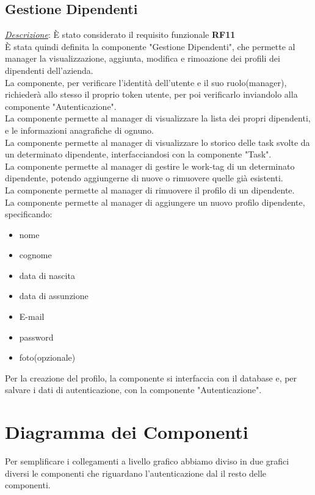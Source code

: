 \documentclass{report}
\begin{document}
\subsection*{Gestione Dipendenti}
\uline{\textit{Descrizione}}:
È stato considerato il requisito funzionale \textbf{RF11}\\
È stata quindi definita la componente "Gestione Dipendenti", che permette al manager la visualizzazione, aggiunta, modifica e rimoazione dei profili dei dipendenti dell'azienda.\\
La componente, per verificare l'identità dell'utente e il suo ruolo(manager), richiederà allo stesso il proprio token utente, per poi verificarlo inviandolo alla componente "Autenticazione".\\
La componente permette al manager di visualizzare la lista dei propri dipendenti, e le informazioni anagrafiche di ognuno.\\
La componente permette al manager di visualizzare lo storico delle task svolte da un determinato dipendente, interfacciandosi con la componente "Task".\\
La componente permette al manager di gestire le work-tag di un determinato dipendente, potendo aggiungerne di nuove o rimuovere quelle già esistenti.\\
La componente permette al manager di rimuovere il profilo di un dipendente.\\
La componente permette al manager di aggiungere un nuovo profilo dipendente, specificando:
\begin{itemize}
	\item nome
	\item cognome
	\item data di nascita
	\item data di assunzione
	\item E-mail
	\item password
	\item foto(opzionale)
\end{itemize}
Per la creazione del profilo, la componente si interfaccia con il database e, per salvare i dati di autenticazione, con la componente "Autenticazione".

\section{Diagramma dei Componenti}

Per semplificare i collegamenti a livello grafico abbiamo diviso in due grafici diversi le componenti che riguardano l'autenticazione dal il resto delle componenti.
\end{document}
